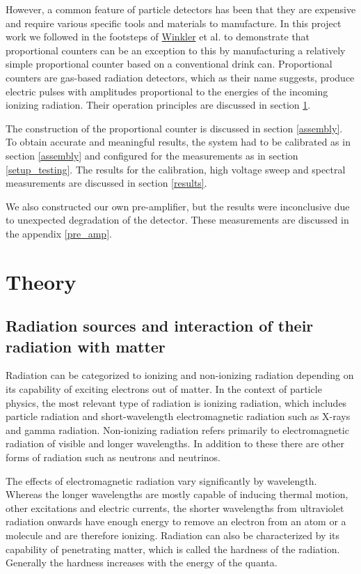 \documentclass[a4paper]{article}
\begin{document}
However, a common feature of particle detectors has been that they are expensive and require various specific tools and materials to manufacture.
In this project work we followed in the footsteps of
\href{https://www.helsinki.fi/en/people/people-finder/alexander-winkler-9110087}{Winkler}
et al. \cite{winkler_gaseous_2015} to demonstrate that proportional counters can be an exception to this by manufacturing a relatively simple proportional counter based on a conventional drink can.
Proportional counters are gas-based radiation detectors, which as their name suggests, produce electric pulses with amplitudes proportional to the energies of the incoming ionizing radiation.
Their operation principles are discussed in section \ref{theory}.

The construction of the proportional counter is discussed in section \ref{assembly}.
To obtain accurate and meaningful results, the system had to be calibrated as in section \ref{assembly} and configured for the measurements as in section \ref{setup_testing}.
The results for the calibration, high voltage sweep and spectral measurements are discussed in section \ref{results}.

We also constructed our own pre-amplifier, but the results were inconclusive due to unexpected degradation of the detector.
These measurements are discussed in the appendix \ref{pre_amp}.


\section{Theory}
\label{theory}

\subsection{Radiation sources and interaction of their radiation with matter}
\iffalse
Radiation can be categorized to ionizing and non-ionizing radiation depending on its capability of exciting electrons out of matter.
In the context of particle physics, the most relevant type of radiation is ionizing radiation, which includes particle radiation and short-wavelength electromagnetic radiation such as X-rays and gamma radiation.
Non-ionizing radiation refers primarily to electromagnetic radiation of visible and longer wavelengths.
In addition to these there are other forms of radiation such as neutrons and neutrinos.
\cite{knoll_radiation_2010}

The effects of electromagnetic radiation vary significantly by wavelength.
Whereas the longer wavelengths are mostly capable of inducing thermal motion, other excitations and electric currents, the shorter wavelengths from ultraviolet radiation onwards have enough energy to remove an electron from an atom or a molecule and are therefore ionizing.
Radiation can also be characterized by its capability of penetrating matter, which is called the hardness of the radiation.
Generally the hardness increases with the energy of the quanta.
\cite{knoll_radiation_2010}
\end{document}
